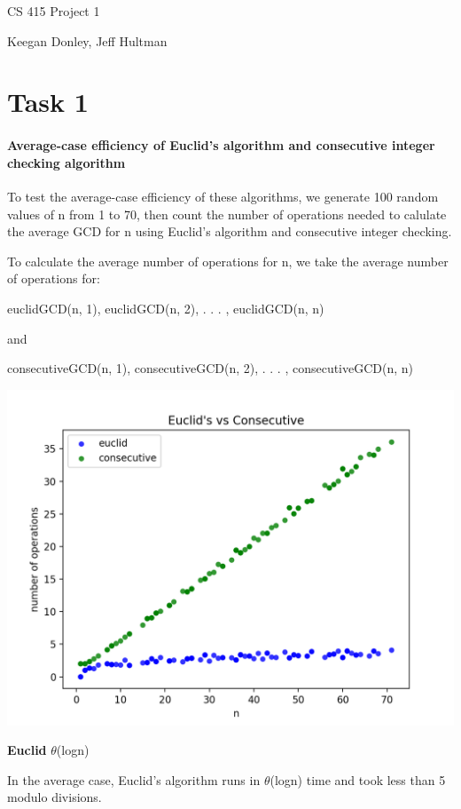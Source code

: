 \documentclass{report}
\begin{document}
	\begin{flushleft}
		\huge CS 415 Project 1
		
		\normalsize Keegan Donley, Jeff Hultman

		\section{Task 1}

		\paragraph{Average-case efficiency of Euclid's algorithm and consecutive integer checking algorithm}
		To test the average-case efficiency of these algorithms, we generate
		100 random values of n from 1 to 70, then count the number of
		operations needed to calulate the average GCD for n using
		Euclid's algorithm and consecutive integer checking.

		To calculate the average number of operations for n, we take the average
		number of operations for:
		
		euclidGCD(n, 1), euclidGCD(n, 2), . . . , euclidGCD(n, n)

		and

		consecutiveGCD(n, 1), consecutiveGCD(n, 2), . . . , consecutiveGCD(n, n)

		\includegraphics{task1.png}

		\textbf{Euclid} $\theta$(logn)

		In the average case, Euclid's algorithm runs in $\theta$(logn) time and took less than 
		5 modulo divisions.
		

\end{flushleft}
\end{document}

